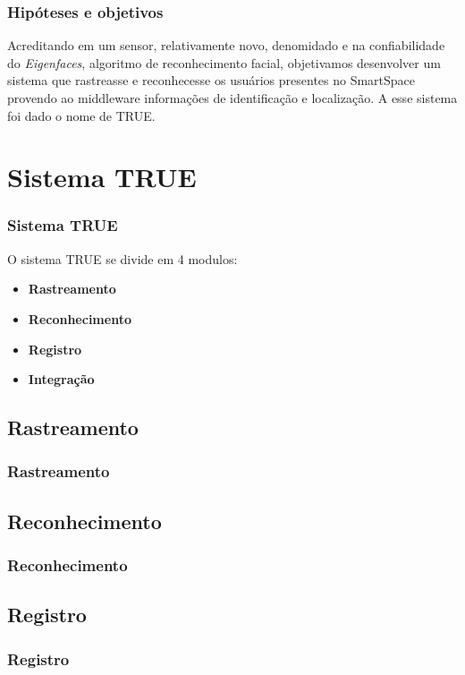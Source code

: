 \documentclass{beamer}
\begin{document}
	\begin{frame}
    	\frametitle{Hipóteses e objetivos}
    	Acreditando em um sensor, relativamente novo, denomidado  e
    	na confiabilidade do \textit{Eigenfaces}, algoritmo de reconhecimento
    	facial, objetivamos desenvolver um sistema que rastreasse e reconhecesse os
    	usuários presentes no SmartSpace provendo ao middleware informações de
    	identificação e localização. A esse sistema foi dado o nome de TRUE.
	\end{frame}
	
\section{Sistema TRUE}

	\begin{frame}
    	\frametitle{Sistema TRUE}
    	O sistema TRUE se divide em 4 modulos:
    		\begin{itemize}
    		  \item \textbf{Rastreamento}
    		  \item \textbf{Reconhecimento}
    		  \item \textbf{Registro}
    		  \item \textbf{Integração}
    		\end{itemize}
    \end{frame}
    
    \subsection{Rastreamento}
		\begin{frame}
	    	\frametitle{Rastreamento}
	    	
	    \end{frame}
    
    \subsection{Reconhecimento}
		\begin{frame}
	    	\frametitle{Reconhecimento}
	    	
	    \end{frame}
    
    \subsection{Registro}
		\begin{frame}
	    	\frametitle{Registro}
	    	
	    \end{frame}
    
\end{document}
